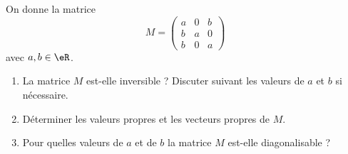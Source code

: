 \begin{exercice}\label{exoTP50004}

	On donne la matrice
	\begin{equation}
		M=\begin{pmatrix}
			a	&	0	&	b	\\
			b	&	a	&	0	\\
			b	&	0	&	a
		\end{pmatrix}
	\end{equation}
	avec $a,b\in\eR$.

	\begin{enumerate}

		\item
			La matrice $M$ est-elle inversible ? Discuter suivant les valeurs de $a$ et $b$ si nécessaire.

		\item
			Déterminer les valeurs propres et les vecteurs propres de $M$.

		\item
			Pour quelles valeurs de $a$ et de $b$ la matrice $M$ est-elle diagonalisable ?

	\end{enumerate}
	

\end{exercice}
